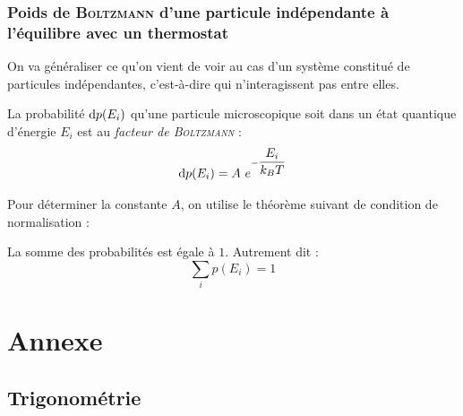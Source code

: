 \documentclass[11pt,a4paper,fleqn,pdftex]{report}
\begin{document}
\subsection[Poids de \textsc{Boltzmann}]{Poids de \textsc{Boltzmann} d'une particule indépendante à l'équilibre avec un thermostat} %
\label{sub:poids_de_boltzmann_d_une_particule_independante_a_l_equilibre_avec_un_thermostat}
On va généraliser ce qu'on vient de voir au cas d'un système constitué de particules indépendantes, c'est-à-dire qui n’interagissent pas entre elles.
\begin{itheorem}
   La probabilité $\mathrm{d} p(E_i)$ qu'une particule microscopique  soit dans un état quantique d'énergie $E_i$ est  au \emph{facteur de \textsc{Boltzmann}} :
   \begin{equation}
    \mathrm{d} p(E_i) = A~e^{-\dfrac{E_i}{k_B T}}
   \end{equation}
\end{itheorem}
Pour déterminer la constante $A$, on utilise le théorème suivant de condition de normalisation : 
\begin{theorem}
La somme des probabilités est égale à $1$. Autrement dit : 
   \begin{equation}
   \sum_i p(E_i) = 1
   \end{equation}
\end{theorem}
\chapter{Annexe}
\section{Trigonométrie}
\end{document}
